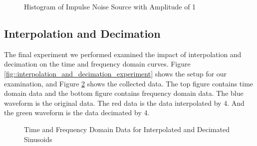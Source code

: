 \documentclass{article}
\begin{document}
\begin{figure}[H]
	\centerline{}
	\caption{Histogram of Impulse Noise Source with Amplitude of 1}
	\label{fig::impulse_noise_histogram}
\end{figure}

\subsection{Interpolation and Decimation}

The final experiment we performed examined the impact of interpolation and decimation on the time and frequency domain curves. Figure \ref{fig::interpolation_and_decimation_experiment} shows the setup for our examination, and Figure \ref{fig::interpolation_and_decimation_waveforms} shows the collected data. The top figure contains time domain data and the bottom figure contains frequency domain data. The blue waveform is the original data. The red data is the data interpolated by 4. And the green waveform is the data decimated by 4.

\begin{figure}[H]
	\centerline{}
	\caption{Time and Frequency Domain Data for Interpolated and Decimated Sinusoids}
	\label{fig::interpolation_and_decimation_waveforms}
\end{figure}
\end{document}
